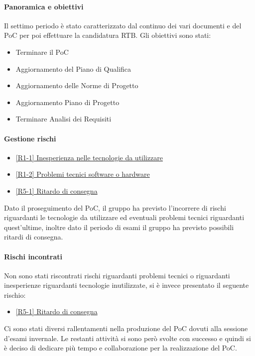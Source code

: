\documentclass[a4paper,12pt]{article}
\begin{document}
            \paragraph{Panoramica e obiettivi}
            Il settimo periodo è stato caratterizzato dal continuo dei vari documenti e del PoC per poi effettuare la candidatura RTB. Gli obiettivi sono stati:
            \begin{itemize}
                \item Terminare il PoC
                \item Aggiornamento del Piano di Qualifica
                \item Aggiornamento delle Norme di Progetto
                \item Aggiornamento Piano di Progetto
                \item Terminare Analisi dei Requisiti
            \end{itemize}
            
            \paragraph{Gestione rischi}
                \begin{itemize}
                \item\hyperref[tab:r1]{[R1-1] Inesperienza nelle tecnologie da utilizzare}
                \item\hyperref[tab:r1]{[R1-2] Problemi tecnici software o hardware}
                \item\hyperref[tab:r5]{[R5-1] Ritardo di consegna}
                \end{itemize}
                Dato il proseguimento del PoC, il gruppo ha previsto l'incorrere di rischi riguardanti le tecnologie da utilizzare ed eventuali problemi tecnici riguardanti quest'ultime, inoltre dato il periodo di esami il gruppo ha previsto possibili ritardi di consegna.
    
                \paragraph*{Rischi incontrati}
                Non sono stati riscontrati rischi riguardanti problemi tecnici o riguardanti inesperienze riguardanti tecnologie inutilizzate, si è invece presentato il seguente rischio:
                \begin{itemize}
                    \item \hyperref[tab:r5]{[R5-1] Ritardo di consegna}
                \end{itemize}
                Ci sono stati diversi rallentamenti nella produzione del PoC dovuti alla sessione d'esami invernale. Le restanti attività si sono però svolte con successo e quindi si è deciso di dedicare più tempo e collaborazione per la realizzazione del PoC.
                
\end{document}
